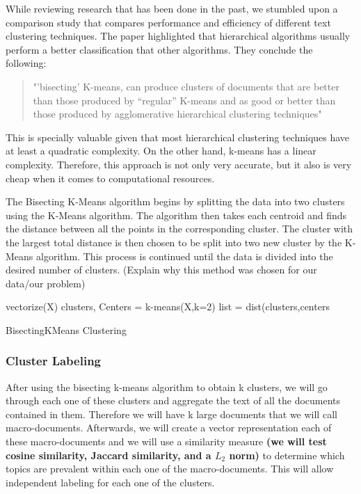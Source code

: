 \documentclass[letterpaper, 11pt]{article}
\newcommand\tab[1][1cm]{\hspace*{#1}}
\begin{document}
While reviewing research that has been done in the past, we stumbled upon a comparison study that compares performance and efficiency of different text clustering techniques. The paper highlighted that hierarchical algorithms usually perform a better classification that other algorithms. They conclude the following:
\begin{quotation}
"'bisecting' K-means, can produce clusters of documents that are better than those produced by “regular” K-means and as good or better than those produced by agglomerative hierarchical clustering techniques"
\end{quotation}
This is specially valuable given that most hierarchical clustering techniques have at least a quadratic complexity. On the other hand, k-means has a linear complexity. Therefore, this approach is not only very accurate, but it also is very cheap when it comes to computational resources.

The Bisecting K-Means algorithm begins by splitting the data into two clusters using the K-Means algorithm. The algorithm then takes each centroid and finds the distance between all the points in the corresponding cluster. The cluster with the largest total distance is then chosen to be split into two new cluster by the K-Means algorithm. This process is continued until the data is divided into the desired number of clusters. (Explain why this method was chosen for our data/our problem)

\begin{algorithm}
 \KwData{K: Number of clusters\\
 \tab X: List of Documents}
 vectorize(X)\;
 clusters, Centers = k-means(X,k=2)\;
 list = dist(clusters,centers\;
 \caption{BisectingKMeans Clustering}
\end{algorithm}

\subsubsection{Cluster Labeling}\label{cluster-labeling}

After using the bisecting k-means algorithm to obtain k clusters, we will go through each one of these clusters and aggregate the text of all the documents contained in them. Therefore we will have k large documents that we will call macro-documents. Afterwards, we will create a vector representation each of these macro-documents and we will use a similarity measure \textbf{(we will test cosine similarity, Jaccard similarity, and a $L_2$ norm)} to determine which topics are prevalent within each one of the macro-documents. This will allow independent labeling for each one of the clusters. 
\end{document}
